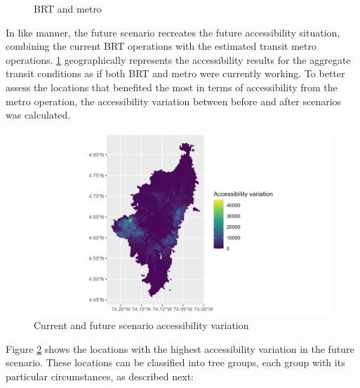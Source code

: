 \documentclass[12pt, a4paper]{report}
\begin{document}
\begin{figure}[H]
\begin{minipage}{0.45\textwidth}
         \caption{BRT and metro}
        \label{fig:Access_BRT_Metro_Base}
    \end{minipage}    
\end{figure}

In like manner, the future scenario recreates the future accessibility situation, combining the current BRT operations with the estimated transit metro operations. \ref{fig:Access_BRT_Metro_Base} geographically represents the accessibility results for the aggregate transit conditions as if both BRT and metro were currently working. To better assess the locations that benefited the most in terms of accessibility from the metro operation, the accessibility variation between before and after scenarios was calculated. 

\begin{figure}[H]
    \centering
    \includegraphics[width=14cm]{Data/Results/Images/Access_diff_BRT_Metro_base.png}
    \caption{Current and future scenario accessibility variation}
    \label{fig:Access_Variation}
\end{figure}

Figure \ref{fig:Access_Variation} shows the locations with the highest accessibility variation in the future scenario. These locations can be classified into tree groups, each group with its particular circumstances, as described next:
\end{document}
